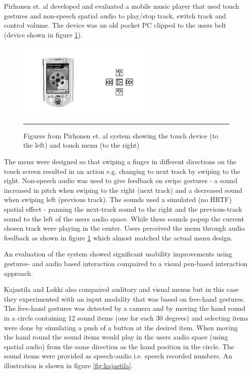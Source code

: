Pirhonen et. al \cite{pirhonen_gestural_2002} developed and evaluated a mobile music player that used touch gestures and non-speech spatial audio to play/stop track, switch track and control volume. The device was an old pocket PC clipped to the users belt (device shown in figure \ref{fig:pirhonen}).

\begin{figure}[t]
	\centering
		\includegraphics[width=0.6\textwidth,height=\textheight,keepaspectratio]{./Figures/pirhonen-system.png}
		\rule{35em}{0.5pt}
	\caption[Pirhonen system]{Figures from Pirhonen et. al \cite{pirhonen_gestural_2002} system showing the touch device (to the left) and touch menu (to the right)}
	\label{fig:pirhonen}
\end{figure}

The menu were designed so that swiping a finger in different directions on the touch screen resulted in an action e.g. changing to next track by swiping to the right. Non-speech audio was used to give feedback on swipe gestures - a sound increased in pitch when swiping to the right (next track) and a decreased sound when swiping left (previous track). The sounds used a simulated (no HRTF) spatial effect - panning the next-track sound to the right and the previous-track sound to the left of the users audio space. While these sounds popup the current chosen track were playing in the center. Users perceived the menu through audio feedback as shown in figure \ref{fig:pirhonen} which almost matched the actual menu design.

An evaluation of the system showed significant usability improvements using gestures- and audio based interaction compaired to a visual pen-based interaction approach.


Kajastila and Lokki \cite{kajastila_eyes-free_2013} also compaired auditory and visual menus but in this case they experimented with an input modality that was based on free-hand gestures. The free-hand gestures was detected by a camera and by moving the hand round in a circle containing 12 sound items (one for each 30 degrees) and selecting items were done by simulating a push of a button at the desired item. When moving the hand round the sound items would play in the users audio space (using spatial audio) from the same direction as the hand position in the circle. The sound items were provided as speech-audio i.e. speech recorded numbers. An illustration is shown in figure \ref{fig:kajastila}.

